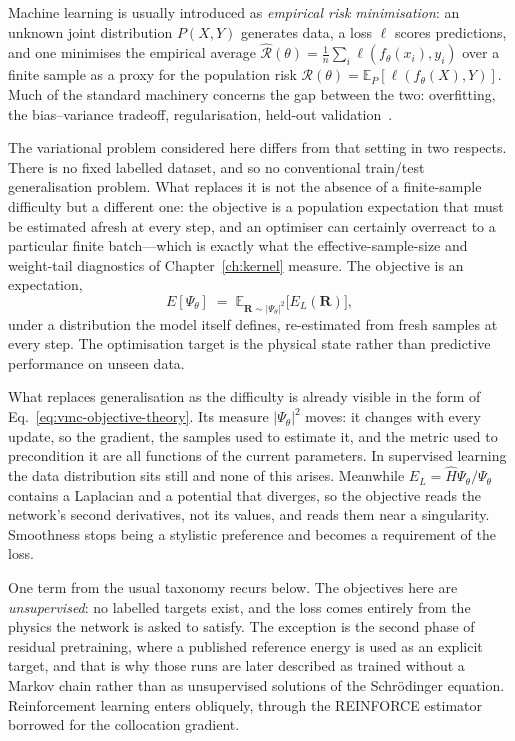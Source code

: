 Machine learning is usually introduced as \emph{empirical risk minimisation}: an unknown
joint distribution $P(X,Y)$ generates data, a loss $\ell$ scores predictions, and one
minimises the empirical average
$\hat{\mathcal R}(\theta)=\tfrac1n\sum_i\ell(f_\theta(x_i),y_i)$ over a finite sample as a
proxy for the population risk $\mathcal R(\theta)=\mathbb E_P[\ell(f_\theta(X),Y)]$. Much of
the standard machinery concerns the gap between the two: overfitting, the bias--variance
tradeoff, regularisation, held-out validation~\cite{HastieTibshiraniFriedman2009-ESL,Berner_Grohs_Kutyniok_Petersen_2022}.

The variational problem considered here differs from that setting in two respects. There is no fixed labelled dataset, and so no conventional train/test generalisation
problem. What replaces it is not the absence of a finite-sample difficulty but a different
one: the objective is a population expectation that must be estimated afresh at every step,
and an optimiser can certainly overreact to a particular finite batch---which is exactly what
the effective-sample-size and weight-tail diagnostics of Chapter~\ref{ch:kernel} measure. The
objective is an expectation,
\begin{equation}
  E[\Psi_\theta] \;=\; \mathbb E_{\mathbf R\sim|\Psi_\theta|^2}\big[E_L(\mathbf R)\big],
  \label{eq:vmc-objective-theory}
\end{equation}
under a distribution the model itself defines, re-estimated from fresh samples at every
step. The optimisation target is the physical state rather than predictive performance on
unseen data.

What replaces generalisation as the difficulty is already visible in the form of
Eq.~\eqref{eq:vmc-objective-theory}. Its measure $|\Psi_\theta|^2$ moves: it changes with
every update, so the gradient, the samples used to estimate it, and the metric used to
precondition it are all functions of the current parameters. In supervised learning the
data distribution sits still and none of this arises. Meanwhile
$E_L=\hat H\Psi_\theta/\Psi_\theta$ contains a Laplacian and a potential that diverges,
so the objective reads the network's second derivatives, not its values, and reads
them near a singularity. Smoothness stops being a stylistic preference and becomes a
requirement of the loss.

One term from the usual taxonomy recurs below. The objectives here are \emph{unsupervised}:
no labelled targets exist, and the loss comes entirely from the physics the network is
asked to satisfy. The exception is the second phase of residual pretraining, where a
published reference energy is used as an explicit target, and that is why those runs are
later described as trained without a Markov chain rather than as unsupervised solutions of
the Schr\"odinger equation. Reinforcement learning enters obliquely, through the REINFORCE
estimator borrowed for the collocation gradient.


